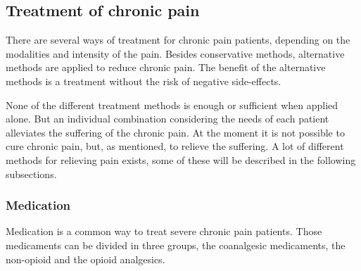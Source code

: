 

\subsection{Treatment of chronic pain}
There are several ways of treatment for chronic pain patients, depending on the modalities and intensity of the pain. Besides conservative methods, alternative methods are applied to reduce chronic pain. The benefit of the alternative methods is a treatment without the risk of negative side-effects. \cite{marcus2009,pope2017}

None of the different treatment methods is enough or sufficient when applied alone. But an individual combination considering the needs of each patient alleviates the suffering of the chronic pain.
At the moment it is not possible to cure chronic pain, but, as mentioned, to relieve the suffering. \cite{marcus2009,pope2017}
A lot of different methods for relieving pain exists, some of these will be described in the following subsections. 

\subsubsection{Medication}
Medication is a common way to treat severe chronic pain patients.%
Those medicaments can be divided in three groups, the coanalgesic medicaments, the non-opioid and the opioid analgesics. \cite{marcus2009}

